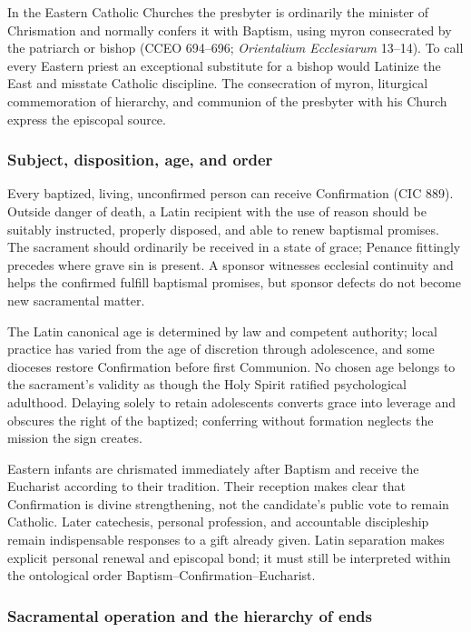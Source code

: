 In the Eastern Catholic Churches the presbyter is ordinarily the minister of Chrismation and normally confers it with Baptism, using myron consecrated by the patriarch or bishop (CCEO 694--696; \emph{Orientalium Ecclesiarum} 13--14). To call every Eastern priest an exceptional substitute for a bishop would Latinize the East and misstate Catholic discipline. The consecration of myron, liturgical commemoration of hierarchy, and communion of the presbyter with his Church express the episcopal source.

\subsubsection{Subject, disposition, age, and order}

Every baptized, living, unconfirmed person can receive Confirmation (CIC 889). Outside danger of death, a Latin recipient with the use of reason should be suitably instructed, properly disposed, and able to renew baptismal promises. The sacrament should ordinarily be received in a state of grace; Penance fittingly precedes where grave sin is present. A sponsor witnesses ecclesial continuity and helps the confirmed fulfill baptismal promises, but sponsor defects do not become new sacramental matter.

The Latin canonical age is determined by law and competent authority; local practice has varied from the age of discretion through adolescence, and some dioceses restore Confirmation before first Communion. No chosen age belongs to the sacrament's validity as though the Holy Spirit ratified psychological adulthood. Delaying solely to retain adolescents converts grace into leverage and obscures the right of the baptized; conferring without formation neglects the mission the sign creates.

Eastern infants are chrismated immediately after Baptism and receive the Eucharist according to their tradition. Their reception makes clear that Confirmation is divine strengthening, not the candidate's public vote to remain Catholic. Later catechesis, personal profession, and accountable discipleship remain indispensable responses to a gift already given. Latin separation makes explicit personal renewal and episcopal bond; it must still be interpreted within the ontological order Baptism--Confirmation--Eucharist.

\subsubsection{Sacramental operation and the hierarchy of ends}

